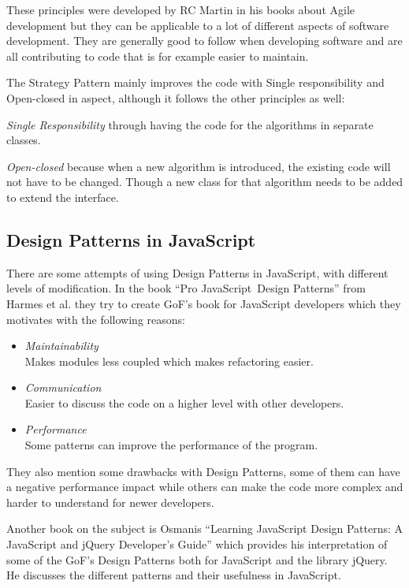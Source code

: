 \documentclass[conference, a4paper]{IEEEtran}
\begin{document}
These principles were developed by RC Martin in his books about Agile development but they can be applicable to a lot of different aspects of software development. They are generally good to follow when developing software and are all contributing to code that is for example easier to maintain.~\cite{bibitem:Bob}

The Strategy Pattern mainly improves the code with Single responsibility and Open-closed in aspect, although it follows the other principles as well:

\textit{Single Responsibility} through having the code for the algorithms in separate classes.

\textit{Open-closed} because when a new algorithm is introduced, the existing code will not have to be changed. Though a new class for that algorithm needs to be added to extend the interface.

\subsection{Design Patterns in JavaScript}
There are some attempts of using Design Patterns in JavaScript, with different levels of modification. In the book ``Pro JavaScript\texttrademark~Design Patterns'' from Harmes et al. they try to create GoF's book for JavaScript developers which they motivates with the following reasons:
\begin{itemize}
    \item \emph{Maintainability} \\
		Makes modules less coupled which makes refactoring easier.
    \item \emph{Communication} \\
		Easier to discuss the code on a higher level with other developers.
    \item \emph{Performance} \\
    Some patterns can improve the performance of the program.
\end{itemize}
They also mention some drawbacks with Design Patterns, some of them can have a negative performance impact while others can make the code more complex and harder to understand for newer developers.~\cite{bibitem:DiazHarmes}

Another book on the subject is Osmanis ``Learning JavaScript Design Patterns: A JavaScript and jQuery Developer's Guide'' which provides his interpretation of some of the GoF's Design Patterns both for JavaScript and the library jQuery. He discusses the different patterns and their usefulness in JavaScript.~\cite{bibitem:Osmani}
\end{document}

